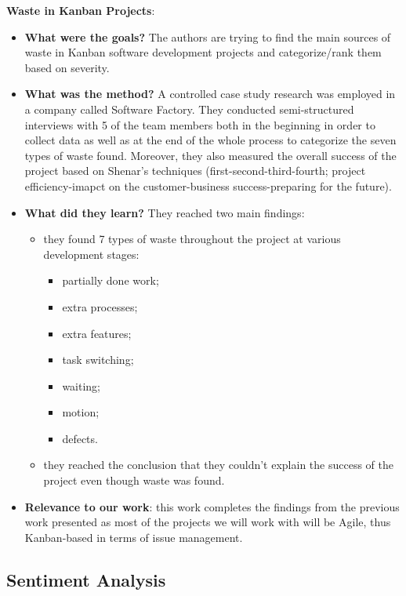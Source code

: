 \documentclass{mprop}
\begin{document}
\textbf{Waste in Kanban Projects}\cite{ikonen2010exploring}:
\begin{itemize}
  \item \textbf{What were the goals?}
    The authors are trying to find the main sources of waste in Kanban software
    development projects and categorize/rank them based on severity.
  \item \textbf{What was the method?}
    A controlled case study research was employed in a company called Software
    Factory. They conducted semi-structured interviews with 5 of the team
    members both in the beginning in order to collect data as well as at the end 
    of the whole process to categorize the seven types of waste found. Moreover,
    they also measured the overall success of the project based on Shenar's
    techniques (first-second-third-fourth; project efficiency-imapct on the
    customer-business success-preparing for the future).
  \item \textbf{What did they learn?}
    They reached two main findings:
      \begin{itemize}
        \item they found 7 types of waste throughout the project at various
          development stages:
            \begin{itemize}
              \item partially done work;
              \item extra processes;
              \item extra features;
              \item task switching;
              \item waiting;
              \item motion;
              \item defects.
            \end{itemize}
        \item they reached the conclusion that they couldn't explain the success
          of the project even though waste was found.
      \end{itemize}
  \item \textbf{Relevance to our work}: this work completes the findings 
    from the previous work presented as most of the projects we will work with
    will be Agile, thus Kanban-based in terms of issue management.
\end{itemize}


\subsection{Sentiment Analysis}
\end{document}
